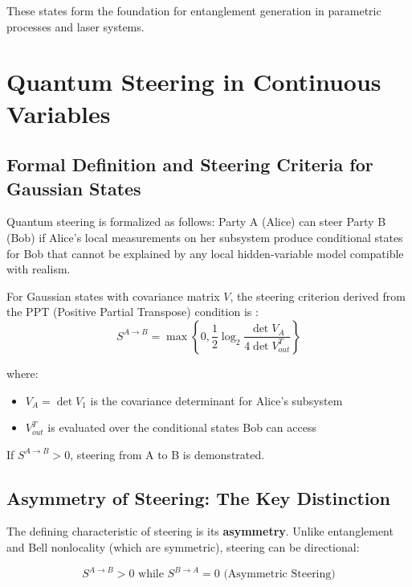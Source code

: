 These states form the foundation for entanglement generation in parametric processes and laser systems.

\section{Quantum Steering in Continuous Variables}

\subsection{Formal Definition and Steering Criteria for Gaussian States}

Quantum steering is formalized as follows: Party A (Alice) can steer Party B (Bob) if Alice's local measurements on her subsystem produce conditional states for Bob that cannot be explained by any local hidden-variable model compatible with realism.

For Gaussian states with covariance matrix $V$, the steering criterion derived from the PPT (Positive Partial Transpose) condition is \cite{kogiastQuantificationGaussianQuantum2015}:
\begin{equation}
S^{A \to B} = \max\left\{0, \frac{1}{2}\log_2\frac{\det V_A}{4\det V_{out}^T}\right\}
\end{equation}

where:
\begin{itemize}
	\item $V_A = \det V_1$ is the covariance determinant for Alice's subsystem
	\item $V_{out}^T$ is evaluated over the conditional states Bob can access
\end{itemize}

If $S^{A \to B} > 0$, steering from A to B is demonstrated.

\subsection{Asymmetry of Steering: The Key Distinction}

The defining characteristic of steering is its \textbf{asymmetry}. Unlike entanglement and Bell nonlocality (which are symmetric), steering can be directional:

\begin{equation}
S^{A \to B} > 0 \text{ while } S^{B \to A} = 0 \text{ (Asymmetric Steering)}
\end{equation}

